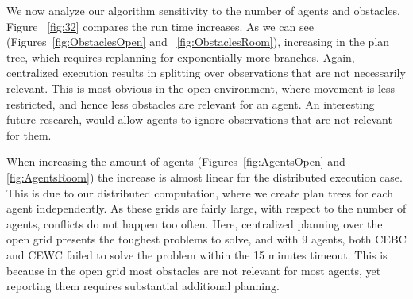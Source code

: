 \documentclass[letterpaper]{article} %
\begin{document}
We now analyze our algorithm sensitivity to the number of agents and obstacles.
Figure ~\ref{fig:32} compares the run time  increases. As we can see (Figures~\ref{fig:ObstaclesOpen} and ~\ref{fig:ObstaclesRoom}), increasing   in the plan tree, which requires replanning for exponentially more branches. Again, centralized execution results in splitting over observations that are not necessarily relevant. This is most obvious in the open environment, where movement is less restricted, and hence less obstacles are relevant for an agent.  An interesting future research, would allow agents to ignore observations that are not relevant for them.

When increasing the amount of agents (Figures~\ref{fig:AgentsOpen} and \ref{fig:AgentsRoom}) the increase is almost linear for the distributed execution case. This is due to our distributed computation, where we create plan trees for each agent independently. As these grids are fairly large, with respect to the number of agents, conflicts do not happen too often. Here, centralized planning over the open grid presents the toughest problems to solve, and with 9 agents, both CEBC and CEWC failed to solve the problem within the 15 minutes timeout. This is because in the open grid most obstacles are not relevant for most agents, yet reporting them requires substantial additional planning.
\end{document}
